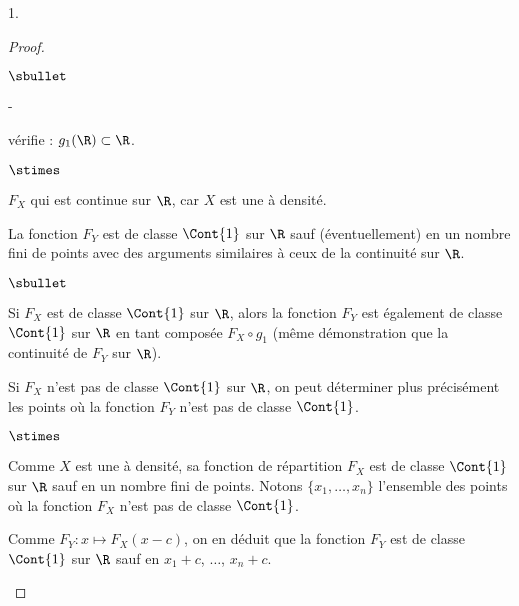 \documentclass[11pt]{article}%
\begin{document}
\begin{noliste}{1.}
\begin{proof}
\begin{noliste}{$\sbullet$}
\begin{liste}{-}
          \item vérifie : $g_1(\R) \subset \R$.
          \end{liste}
          \begin{noliste}{$\stimes$}
          \item $F_X$ qui est continue sur $\R$, car $X$ est une \var
            à densité.
          \end{noliste}

        \item La fonction $F_Y$ est de classe $\Cont{1}$ sur $\R$ sauf
          (éventuellement) en un nombre fini de points avec des
          arguments similaires à ceux de la continuité sur $\R$.

          
          \newpage
          
          
          \begin{remark}
            \begin{noliste}{$\sbullet$}
            \item Si $F_X$ est de classe $\Cont{1}$ sur $\R$, alors la
              fonction $F_Y$ est également de classe $\Cont{1}$ sur
              $\R$ en tant composée $F_X \circ g_1$ (même démonstration
              que la continuité de $F_Y$ sur $\R$).
              
            \item Si $F_X$ n'est pas de classe $\Cont{1}$ sur $\R$,
              on peut déterminer plus précisément les points
              où la fonction $F_Y$ n'est pas de classe $\Cont{1}$.
              \begin{noliste}{$\stimes$}
              \item Comme $X$ est une \var à densité, sa fonction de
                répartition $F_X$ est de classe $\Cont{1}$ sur $\R$ sauf
                en un nombre fini de points. Notons
                $\{x_1, \ldots, x_n\}$ l'ensemble des
                points où la fonction $F_X$ n'est pas de classe $\Cont{1}$.
              
              \item Comme $F_Y : x \mapsto F_X(x-c)$, on en déduit que
                la fonction $F_Y$ est de classe $\Cont{1}$ sur $\R$ sauf
                en $x_1+c$, $\ldots$, $x_n +c$.
              \end{noliste}
            \end{noliste}
          \end{remark}
          

\end{noliste}
\end{proof}
\end{noliste}
\end{document}
